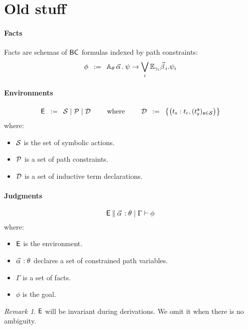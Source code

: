 \documentclass[a4paper]{article}
\theoremstyle{remark}
\newtheorem{remark}{Remark}
\begin{document}
\section{Old stuff}



\paragraph{Facts}
Facts are schemas of $\textsf{BC}$ formulas indexed by path constraints:
\[
  \phi \mdef
  \cforall_\theta\, \valpha.\;
  \psi
  \ra
  \bigvee_{i}
  \cexists_\gammai \vbetai. \psi_i
\]

\paragraph{Environments}
\[
  \textsf{E} \;\;\mathbin{:=}\;\;
  \mathcal{S} \mid
  \mathcal{P} \mid
  \mathcal{D}
  \qquad
  \text{ where }
  \qquad
  \mathcal{D} \;\;\mathbin{:=}\;\;
  \left\{
    \left(t_{\textsf{x}} : t_\epsilon,(t_{\textsf{y}}^{\textsf{a}})_{{\textsf{a}} \in \mathcal{S}}\right)
  \right\}
\]
where:
\begin{itemize}
\item $\mathcal{S}$ is the set of symbolic actions.
\item $\mathcal{P}$ is a set of path constraints.
\item $\mathcal{D}$ is a set of inductive term declarations.
\end{itemize}
\paragraph{Judgments}
\[
  \ejudge{\env}{\facts{\valpha}{\theta}{\Gamma}}{\phi}
\]
where:
\begin{itemize}
\item $\textsf{E}$ is the environment.
\item $\pvtype{\valpha}{\theta}$ declares a set of constrained path variables.
\item $\Gamma$ is a set of facts.
\item $\phi$ is the goal.
\end{itemize}

\begin{remark}
  $\textsf{E}$ will be invariant during derivations. We omit it when there is no ambiguity.
\end{remark}
\end{document}

